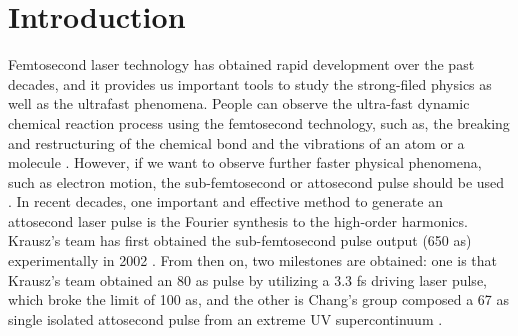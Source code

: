 \documentclass[10pt,letterpaper]{article}
\begin{document}
\section{Introduction}
Femtosecond laser technology has obtained rapid development over the past decades, and it provides us important tools to study the strong-filed physics as well as the ultrafast phenomena. People can observe the ultra-fast dynamic chemical reaction process using the femtosecond technology, such as, the breaking and restructuring of the chemical bond \cite{Mokhtari-chemical-bond-Nature-1990} and the vibrations of an atom or a molecule \cite{Ergler-Vibration-PRL-2006}. However, if we want to observe further faster physical phenomena, such as electron motion, the sub-femtosecond or attosecond pulse should be used \cite{Uiberacker-Attosecond-real-time-Nature-2007}. In recent decades, one important and effective method to generate an attosecond laser pulse is the Fourier synthesis to the high-order harmonics. Krausz's team has first obtained the sub-femtosecond pulse output (650 as) experimentally in 2002 \cite{Krausz-Attosecon-Review-2009}. From then on, two milestones are obtained: one is that Krausz's team \cite{Krausz-Attosecon-Review-2009} obtained an 80 as pulse by utilizing a 3.3 fs driving laser pulse, which broke the limit of 100 as, and the other is Chang's group composed a 67 as single isolated attosecond pulse from an extreme UV supercontinuum \cite{Chang2012-OL-67as}.
\end{document}
